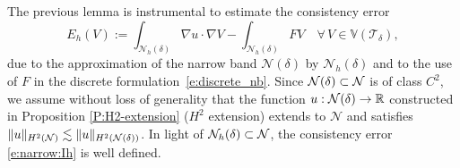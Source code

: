 The previous lemma is instrumental to estimate the consistency error 
%
\begin{equation}\label{e:narrow:Ih}
  E_h(V):=\int_{\mathcal N_h(\delta)} \nabla u \cdot \nabla V - \int_{\mathcal N_h(\delta)} F V \quad\forall \, V \in \mathbb V(\mathcal T_\delta),
\end{equation}
%
due to the approximation of the narrow band $\mathcal N(\delta)$ by $\mathcal N_h(\delta)$ and to the use of $F$ in the discrete formulation~\eqref{e:discrete_nb}. Since ${\mathcal{N}(\delta)}\subset\mathcal{N}$ is of class $C^2$, we assume without loss of generality that the function $u:{\mathcal{N}(\delta)}\to\mathbb{R}$ constructed in Proposition \ref{P:H2-extension} ($H^2$ extension) extends to $\mathcal{N}$ and satisfies $\|u\|_{H^2(\mathcal{N})} \lesssim \|u\|_{H^2({\mathcal{N}(\delta)})}$. In light of ${\mathcal{N}_h(\delta)}\subset\mathcal{N}$, the consistency error \eqref{e:narrow:Ih} is well defined.


